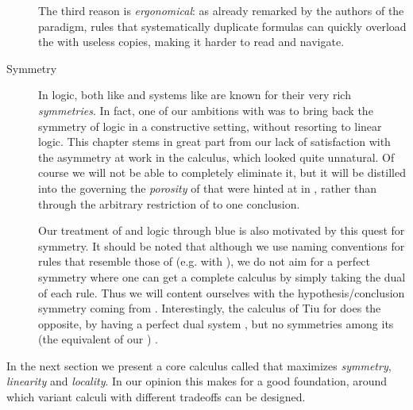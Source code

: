 \begin{scope}
\begin{scope}
\begin{description}
    The third reason is \emph{ergonomical}: as already remarked by the authors
    of the  paradigm,
    rules that systematically duplicate formulas can quickly overload the
     with useless copies, making it harder to read and navigate.
  \item[Symmetry] 
    In  logic, both  like  and  systems like  are known for their very rich
    \emph{symmetries}. In fact, one of our ambitions with  was to
    bring back the symmetry of  logic in a constructive setting,
    without resorting to linear logic. This chapter stems in great part from our
    lack of satisfaction with the asymmetry at work in the  calculus,
    which looked quite unnatural. Of course we will not be able to completely
    eliminate it, but it will be distilled into the  governing the
    \emph{porosity} of  that were hinted at in ,
    rather than through the arbitrary restriction of  to one
    conclusion.
    
    Our treatment of  and  logic
    through blue  is also motivated by this quest for symmetry. It
    should be noted that although we use naming conventions for rules that
    resemble those of  (e.g. with ), we do not aim for
    a perfect symmetry where one can get a complete calculus by simply taking
    the dual of each rule. Thus we will content ourselves with the
    hypothesis/conclusion symmetry coming from .
    Interestingly, the calculus  of Tiu for 
     does the opposite, by having a perfect dual system
    , but no symmetries among its  (the equivalent of
    our ) .
\end{description}

In the next section we present a core calculus called  that
maximizes \emph{symmetry}, \emph{linearity} and \emph{locality}. In our opinion
this makes for a good  foundation, around which variant
calculi with different tradeoffs can be designed.


\end{scope}
\end{scope}
